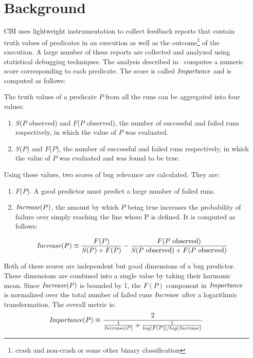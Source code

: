 
\section{Background}
\label{sec-bground}
CBI uses lightweight instrumentation to collect feedback reports that contain truth values of predicates in an execution as well as the outcome{\footnote{crash and non-crash or some other binary classification}} of the execution.  A large number of these reports are collected and analyzed using statistical debugging techniques.  The analysis described in~\cite{Liblit:2005:SSBI} computes a numeric score corresponding to each predicate.  The score is called $\mathit{Importance}$ and is computed as follows:

The truth values of a predicate $P$ from all the runs can be aggregated into four values:

\begin{enumerate}
\item $S$($P$ observed) and $F$($P$ observed), the number of successful and failed runs respectively, in which the value of $P$ was evaluated.
\item $S$($P$) and $F$($P$), the number of successful and failed runs respectively, in which the value of $P$ was evaluated and was found to be true.
\end{enumerate}

Using these values, two scores of bug relevance are calculated.  They are:
\begin{enumerate}
\item $F$($P$).  A good predictor must predict a large number of failed runs.
\item $\mathit{Increase}(P)$, the amount by which $P$ being true increases the probability of failure over simply reaching the line where P is defined.  It is computed as follows:

\begin{equation}
\label{eqn1}
\mathit{Increase}(P) \equiv
\frac{F(P)}{S(P) + F(P)}
-
\frac{F(\text{$P$ observed})}{S(\text{$P$ observed}) +
  F(\text{$P$ observed})}
\end{equation}
\end{enumerate}

Both of these scores are independent but good dimensions of a bug predictor.  These dimensions are combined into a single value by taking their harmonic mean.  Since $\mathit{Increase}(P)$ is bounded by 1, the $F(P)$ component in $\mathit{Importance}$ is normalized over the total number of failed runs $\mathit{Increase}$ after a logarithmic transformation.  The overall metric is:
\begin{equation}
\label{eqn2}
\mathit{Importance}(P) \equiv
\frac{2}{
  \frac{1}{\mathit{Increase}(P)}
  +
  \frac{1}{log(F(P)) / log(\mathit{Increase})}}
\end{equation}

